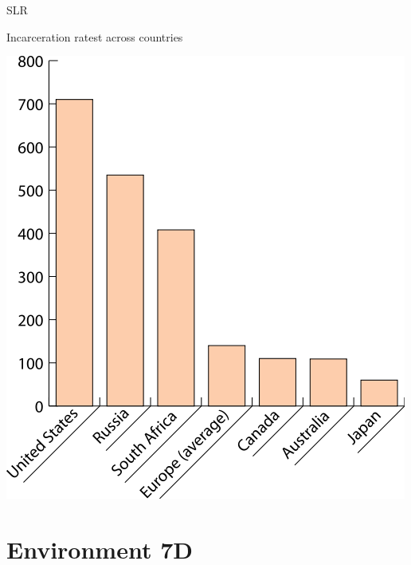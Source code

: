 \begin{chart}{S}{LR}
\caption{Incarceration ratest across countries}
\label{chart:incarceration}
\includegraphics[width=\chartwidth,height=\chartheight]{incarceration}  
\end{chart}


\section{Environment 7D}

